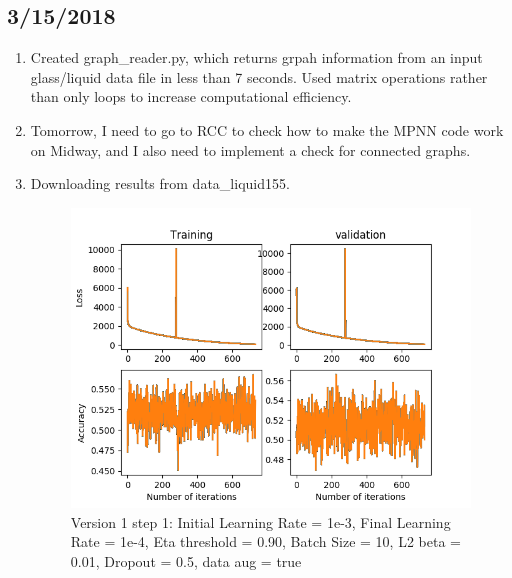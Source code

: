 \documentclass[12pt,reqno]{amsart}
\numberwithin{equation}{section}
\begin{document}
\subsection{3/15/2018}
\begin{enumerate}
\item Created graph\_reader.py, which returns grpah information from an input glass/liquid data file in less than 7 seconds.  Used matrix operations rather than only loops to increase computational efficiency.  
\item Tomorrow, I need to go to RCC to check how to make the MPNN code work on Midway, and I also need to implement a check for connected graphs.
\item Downloading results from data\_liquid155.  


\begin{figure}[H]
\centering
\includegraphics[scale=0.6]{data_liquid155_version1_step1}
\caption{Version 1 step 1: Initial Learning Rate = 1e-3, Final Learning Rate = 1e-4, Eta threshold = 0.90, Batch Size = 10, L2 beta = 0.01, Dropout = 0.5, data aug = true}
\end{figure}


\end{enumerate}
\end{document}
